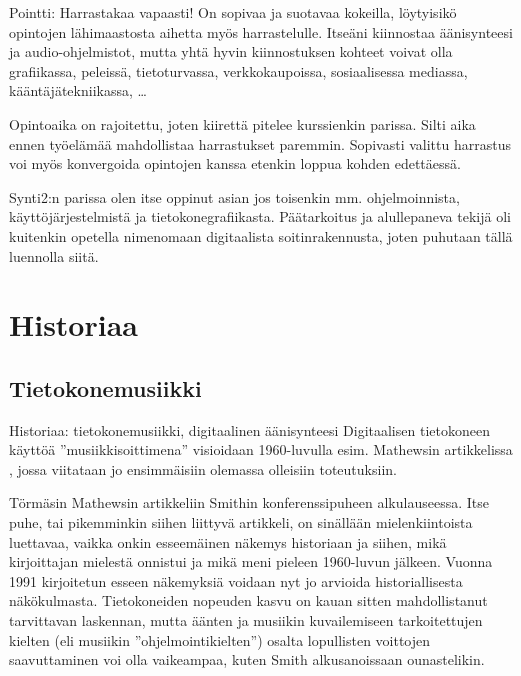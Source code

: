 \documentclass[pdf,10pt]{beamer}
\begin{document}
\begin{frame}{Pointti: Harrastakaa vapaasti!}
  On sopivaa ja suotavaa kokeilla, löytyisikö opintojen lähimaastosta
  aihetta myös harrastelulle. Itseäni kiinnostaa äänisynteesi ja
  audio-ohjelmistot, mutta yhtä hyvin kiinnostuksen kohteet voivat
  olla grafiikassa, peleissä, tietoturvassa, verkkokaupoissa,
  sosiaalisessa mediassa, kääntäjätekniikassa, \ldots

  Opintoaika on rajoitettu, joten kiirettä pitelee kurssienkin
  parissa. Silti aika ennen työelämää mahdollistaa harrastukset
  paremmin. Sopivasti valittu harrastus voi myös konvergoida opintojen
  kanssa etenkin loppua kohden edettäessä.

  Synti2:n parissa olen itse oppinut asian jos toisenkin
  mm. ohjelmoinnista, käyttöjärjestelmistä ja tietokonegrafiikasta.
  Päätarkoitus ja alullepaneva tekijä oli kuitenkin opetella
  nimenomaan digitaalista soitinrakennusta, joten puhutaan tällä
  luennolla siitä.
\end{frame}

\section{Historiaa}

\subsection{Tietokonemusiikki}
\begin{frame}{Historiaa: tietokonemusiikki, digitaalinen äänisynteesi}
  Digitaalisen tietokoneen käyttöä ''musiikkisoittimena'' visioidaan
  1960-luvulla esim. Mathewsin artikkelissa
  \cite{Mathews63thedigital}, jossa viitataan jo ensimmäisiin olemassa
  olleisiin toteutuksiin.

  Törmäsin Mathewsin artikkeliin Smithin konferenssipuheen
  \cite{smith1991viewpoints} alkulauseessa. Itse puhe, tai pikemminkin siihen
  liittyvä artikkeli, on sinällään mielenkiintoista luettavaa, vaikka
  onkin esseemäinen näkemys historiaan ja siihen, mikä kirjoittajan
  mielestä onnistui ja mikä meni pieleen 1960-luvun jälkeen. Vuonna
  1991 kirjoitetun esseen näkemyksiä voidaan nyt jo arvioida
  historiallisesta näkökulmasta. Tietokoneiden nopeuden kasvu on kauan
  sitten mahdollistanut tarvittavan laskennan, mutta äänten ja
  musiikin kuvailemiseen tarkoitettujen kielten (eli
  musiikin ''ohjelmointikielten'') osalta lopullisten voittojen
  saavuttaminen voi olla vaikeampaa, kuten Smith alkusanoissaan
  ounastelikin.
  
\end{frame}
\end{document}

